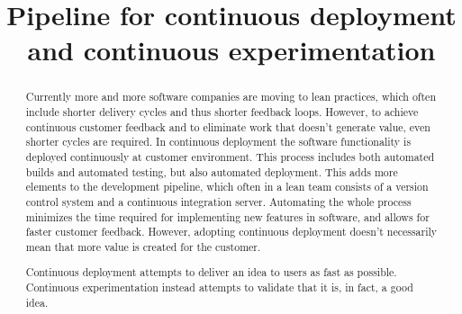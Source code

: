 \documentclass[conference]{IEEEtran}
\begin{document}
\title{Pipeline for continuous deployment and continuous experimentation}

\author{
}

\maketitle


\begin{abstract}
Currently more and more software companies are moving to lean practices, which often include shorter delivery cycles and thus shorter feedback loops. However, to achieve continuous customer feedback and to eliminate work that doesn't generate value, even shorter cycles are required. In continuous deployment the software functionality is deployed continuously at customer environment. This process includes both automated builds and automated testing, but also automated deployment. This adds more elements to the development pipeline, which often in a lean team consists of a version control system and a continuous integration server. Automating the whole process minimizes the time required for implementing new features in software, and allows for faster customer feedback. However, adopting continuous deployment doesn't necessarily mean that more value is created for the customer. 

Continuous deployment attempts to deliver an idea to users as fast as possible. Continuous experimentation instead attempts to validate that it is, in fact, a good idea.

\end{abstract}





%
\end{document}

